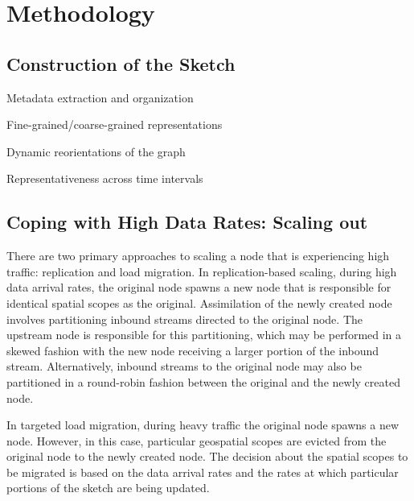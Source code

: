 

\section{Methodology}
\label{sec:methodology}

\subsection{Construction of the Sketch}
Metadata extraction and organization

Fine-grained/coarse-grained representations

Dynamic reorientations of the graph

Representativeness across time intervals


\subsection{Coping with High Data Rates: Scaling out}
\label{subsec:scaling-out}
There are two primary approaches to scaling a node that is experiencing high traffic: replication and load migration.   In replication-based scaling, during high data arrival rates, the original node spawns a new node that is responsible for identical spatial scopes as the original. Assimilation of the newly created node involves partitioning inbound streams directed to the original node. The upstream node is responsible for this partitioning, which may be performed in a skewed fashion with the new node receiving a larger portion of the inbound stream.  Alternatively, inbound streams to the original node may also be partitioned in a round-robin fashion between the original and the newly created node.

In targeted load migration, during heavy traffic the original node spawns a new node. However, in this case, particular geospatial scopes are evicted from the original node to the newly created node. The decision about the spatial scopes to be migrated is based on the data arrival rates and the rates at which particular portions of the sketch are being updated.


